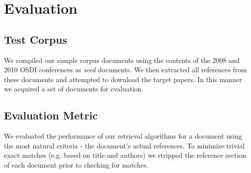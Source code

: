 \section{Evaluation}
\subsection{Test Corpus}
We compiled our sample corpus documents using the contents of 
the 2008 and 2010 OSDI conferences as \emph{seed} documents.  We then extracted 
all references from these documents and attempted to download the target 
papers.  In this manner we acquired a set of \corpussize documents for 
evaluation.

\subsection{Evaluation Metric}

We evaluated the performance of our retrieval algorithms for a document using 
the most natural criteria - the document's actual references.  To minimize
trivial exact matches (e.g. based on title and authors) we stripped the 
reference section of each document prior to checking for matches.
